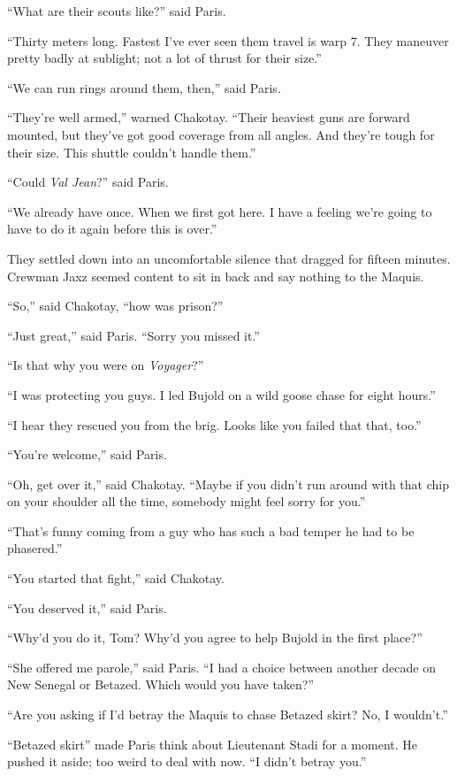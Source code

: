 \documentclass[twoside,letterpaper,12pt]{memoir}
\begin{document}
``What are their scouts like?'' said Paris.

``Thirty meters long. Fastest I've ever seen them travel is warp 7. They maneuver pretty badly at sublight; not a lot of thrust for their size.''

``We can run rings around them, then,'' said Paris.

``They're well armed,'' warned Chakotay. ``Their heaviest guns are forward mounted, but they've got good coverage from all angles. And they're tough for their size. This shuttle couldn't handle them.''

``Could \textit{Val Jean}?'' said Paris.

``We already have once. When we first got here. I have a feeling we're going to have to do it again before this is over.''

They settled down into an uncomfortable silence that dragged for fifteen minutes. Crewman Jaxz seemed content to sit in back and say nothing to the Maquis.

``So,'' said Chakotay, ``how was prison?''

``Just great,'' said Paris. ``Sorry you missed it.''

``Is that why you were on \textit{Voyager}?''

``I was protecting you guys. I led Bujold on a wild goose chase for eight hours.''

``I hear they rescued you from the brig. Looks like you failed that that, too.''

``You're welcome,'' said Paris.

``Oh, get over it,'' said Chakotay. ``Maybe if you didn't run around with that chip on your shoulder all the time, somebody might feel sorry for you.''

``That's funny coming from a guy who has such a bad temper he had to be phasered.''

``You started that fight,'' said Chakotay.

``You deserved it,'' said Paris.

``Why'd you do it, Tom? Why'd you agree to help Bujold in the first place?''

``She offered me parole,'' said Paris. ``I had a choice between another decade on New Senegal or Betazed. Which would you have taken?''

``Are you asking if I'd betray the Maquis to chase Betazed skirt? No, I wouldn't.''

``Betazed skirt'' made Paris think about Lieutenant Stadi for a moment. He pushed it aside; too weird to deal with now. ``I didn't betray you.''
\end{document}
